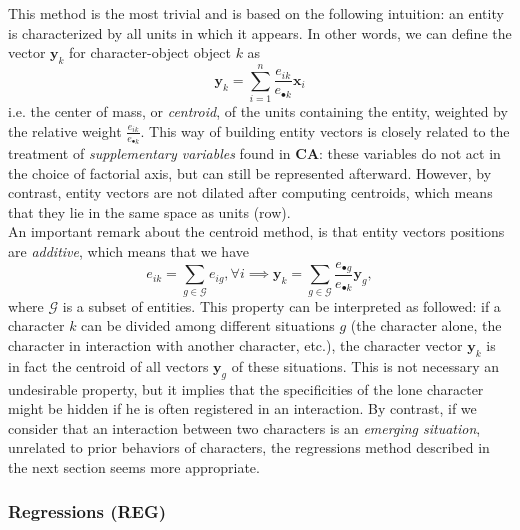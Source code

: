 \documentclass[
twocolumn,
]{ceurart}
\begin{document}
This method is the most trivial and is based on the following intuition: an entity is characterized by all units in which it appears. In other words, we can define the vector $\mathbf{y}_k$ for character-object object $k$ as
\begin{equation}
\mathbf{y}_k = \sum_{i=1}^n \frac{e_{ik}}{e_{\bullet k}} \mathbf{x}_i
\end{equation}
i.e. the center of mass, or \emph{centroid}, of the units containing the entity, weighted by the relative weight $\frac{e_{ik}}{e_{\bullet k}}$. This way of building entity vectors is closely related to the treatment of \emph{supplementary variables} found in \textbf{CA}: these variables do not act in the choice of factorial axis, but can still be represented afterward. However, by contrast, entity vectors are not dilated after computing centroids, which means that they lie in the same space as units (row). \\
An important remark about the centroid method, is that entity vectors positions are \emph{additive}, which means that we have
\begin{equation}
e_{ik} = \sum_{g \in \mathcal{G}} e_{ig}, \forall i \implies \mathbf{y}_k = \sum_{g \in \mathcal{G}} \frac{e_{\bullet g}}{e_{\bullet k}} \mathbf{y}_g,
\end{equation}
where $\mathcal{G}$ is a subset of entities. This property can be interpreted as followed: if a character $k$ can be divided among different situations $g$ (the character alone, the character in interaction with another character, etc.), the character vector $\mathbf{y}_k$ is in fact the centroid of all vectors $\mathbf{y}_g$ of these situations. This is not necessary an undesirable property, but it implies that the specificities of the lone character might be hidden if he is often registered in an interaction. By contrast, if we consider that an interaction between two characters is an \emph{emerging situation}, unrelated to prior behaviors of characters, the regressions method described in the next section seems more appropriate.

\subsubsection{Regressions (REG)}
\label{regression}
\end{document}
